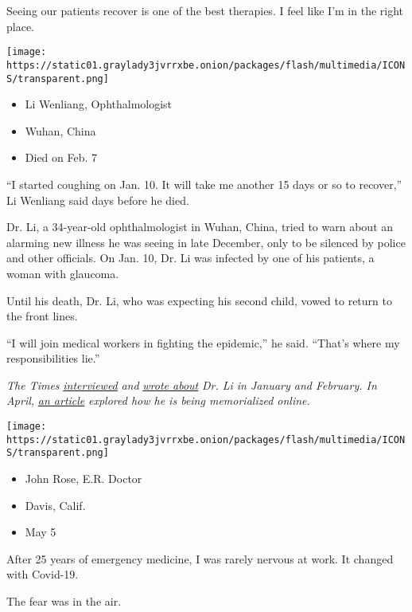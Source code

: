 Seeing our patients recover is one of the best therapies. I feel like
I'm in the right place.

\texttt{[image: https://static01.graylady3jvrrxbe.onion/packages/flash/multimedia/ICONS/transparent.png]}

\begin{itemize}
\tightlist
\item
  Li Wenliang, Ophthalmologist
\item
  Wuhan, China
\item
  Died on Feb. 7
\end{itemize}

``I started coughing on Jan. 10. It will take me another 15 days or so
to recover,'' Li Wenliang said days before he died.

Dr. Li, a 34-year-old ophthalmologist in Wuhan, China, tried to warn
about an alarming new illness he was seeing in late December, only to be
silenced by police and other officials. On Jan. 10, Dr. Li was infected
by one of his patients, a woman with glaucoma.

Until his death, Dr. Li, who was expecting his second child, vowed to
return to the front lines.

``I will join medical workers in fighting the epidemic,'' he said.
``That's where my responsibilities lie.''

\emph{The Times}
\emph{\href{https://www.nytimes3xbfgragh.onion/2020/02/07/world/asia/Li-Wenliang-china-coronavirus.html}{interviewed}}
\emph{and}
\emph{\href{https://www.nytimes3xbfgragh.onion/2020/02/01/world/asia/china-coronavirus.html}{wrote
about}} \emph{Dr. Li in January and February. In April,}
\emph{\href{https://www.nytimes3xbfgragh.onion/interactive/2020/04/13/technology/coronavirus-doctor-whistleblower-weibo.html}{an
article}} \emph{explored how he is being memorialized online.}

\texttt{[image: https://static01.graylady3jvrrxbe.onion/packages/flash/multimedia/ICONS/transparent.png]}

\begin{itemize}
\tightlist
\item
  John Rose, E.R. Doctor
\item
  Davis, Calif.
\item
  May 5
\end{itemize}

After 25 years of emergency medicine, I was rarely nervous at work. It
changed with Covid-19.

The fear was in the air.

